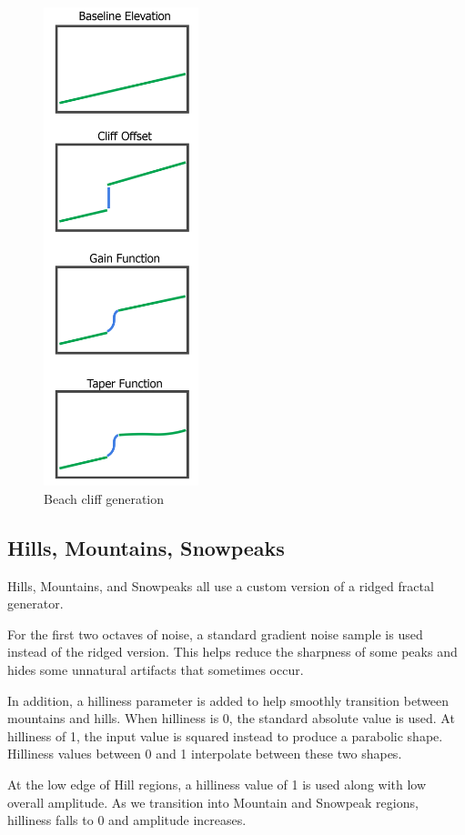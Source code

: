 \begin{figure}
  \centering
    \includegraphics[width=0.4\textwidth]{figures/beachcliffs}
  \caption{Beach cliff generation}
  \label{fig:beach_cliffs}
\end{figure}

\subsection{Hills, Mountains, Snowpeaks}

Hills, Mountains, and Snowpeaks all use a custom version of a ridged fractal generator.

For the first two octaves of noise, a standard gradient noise sample is used instead of the ridged version.
This helps reduce the sharpness of some peaks and hides some unnatural artifacts that sometimes occur.

In addition, a hilliness parameter is added to help smoothly transition between mountains and hills.
When hilliness is 0, the standard absolute value is used.
At hilliness of 1, the input value is squared instead to produce a parabolic shape.
Hilliness values between 0 and 1 interpolate between these two shapes.

At the low edge of Hill regions, a hilliness value of 1 is used along with low overall amplitude.
As we transition into Mountain and Snowpeak regions, hilliness falls to 0 and amplitude increases.
